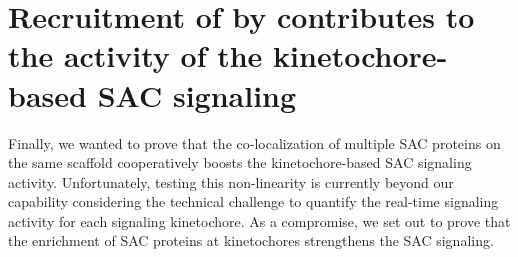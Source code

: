 \section{Recruitment of  by   contributes to the activity of the kinetochore-based SAC signaling}
\label{per_se}


Finally, we wanted to prove that the co-localization of multiple SAC proteins on the same  scaffold cooperatively boosts the kinetochore-based SAC signaling activity. Unfortunately, testing this non-linearity  is currently beyond our capability considering the technical challenge to quantify the real-time signaling activity for each signaling kinetochore. As a compromise, we set out to prove that the enrichment of SAC proteins at kinetochores strengthens the SAC signaling.

